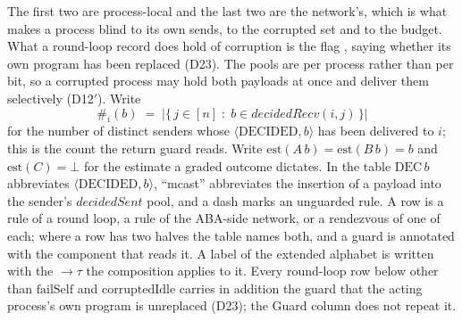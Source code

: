 The first two are process-local and the last two are the network's, which is
what makes a process blind to its own sends, to the corrupted set and to the
budget.
What a round-loop record does hold of corruption is the flag
, saying whether its own program has been
replaced (D23).
The pools are per process rather than per bit, so a corrupted process may hold
both payloads at once and deliver them selectively (D12$'$).
Write
\[
  \#_i(b) \;=\; |\{\, j \in [n] \;:\; b \in \mathit{decidedRecv}(i,j) \,\}|
\]
for the number of distinct senders whose $\langle\mathrm{DECIDED}, b\rangle$
has been delivered to $i$; this is the count the return guard reads.
Write $\mathrm{est}(A\,b) = \mathrm{est}(B\,b) = b$ and
$\mathrm{est}(C) = \bot$ for the estimate a graded outcome dictates.
In the table $\mathrm{DEC}\,b$ abbreviates $\langle\mathrm{DECIDED}, b\rangle$,
``mcast'' abbreviates the insertion of a payload into the sender's
$\mathit{decidedSent}$ pool, and a dash marks an unguarded rule.
A row is a rule of a round loop, a rule of the ABA-side network, or a
rendezvous of one of each; where a row has two halves the table names both, and
a guard is annotated with the component that reads it.
A label of the extended alphabet is written with the $\to\tau$ the composition
applies to it.
Every round-loop row below other than $\mathrm{failSelf}$ and
$\mathrm{corruptedIdle}$ carries in addition the guard that the acting process's
own program is unreplaced (D23); the Guard column does not repeat it.

